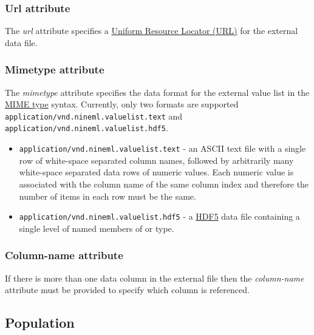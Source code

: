 \documentclass[draftspec]{ninemlspec}
\begin{document}
\subsubsection{Url attribute}
The \textit{url} attribute specifies a \href{http://en.wikipedia.org/wiki/Uniform_resource_locator}{Uniform Resource Locator (URL)} for the external data file.

\subsubsection{Mimetype attribute}
The \textit{mimetype} attribute specifies the data format for the external value list in the \href{http://en.wikipedia.org/wiki/Internet_media_type}{MIME type} syntax. Currently, only two formats are supported \lstinline|application/vnd.nineml.valuelist.text| and \lstinline|application/vnd.nineml.valuelist.hdf5|. 

\begin{itemize}
\item \lstinline|application/vnd.nineml.valuelist.text| - an ASCII text file with a single row of white-space separated column names, followed by arbitrarily many white-space separated data rows of numeric values. Each numeric value is associated with the column name of the same column index and therefore the number of items in each row must be the same.
\item \lstinline|application/vnd.nineml.valuelist.hdf5| - a \href{http://www.hdfgroup.org/HDF5/}{HDF5} data file containing a single level of named members of  or  type.
\end{itemize}

\subsubsection{Column-name attribute}
If there is more than one data column in the external file then the \textit{column-name} attribute must be provided to specify which column is referenced.

\subsection{Population}
\label{sec:Population}
\end{document}
